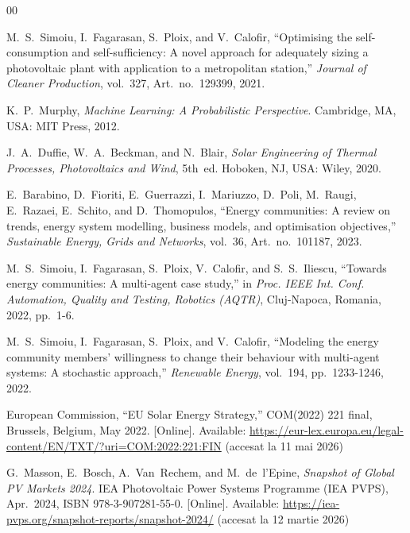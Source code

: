 \documentclass[12pt,a4paper]{report}
\begin{document}
\clearpage

\renewcommand{\bibname}{6. Bibliografie}
\begin{thebibliography}{00}

  M.~S.~Simoiu, I.~Fagarasan, S.~Ploix, and V.~Calofir,
  ``Optimising the self-consumption and self-sufficiency: A novel approach for adequately sizing a photovoltaic plant with application to a metropolitan station,''
  \emph{Journal of Cleaner Production}, vol.~327, Art.~no.~129399, 2021.


  K.~P.~Murphy, \emph{Machine Learning: A Probabilistic Perspective}.
  Cambridge, MA, USA: MIT Press, 2012.

  J.~A.~Duffie, W.~A.~Beckman, and N.~Blair,
  \emph{Solar Engineering of Thermal Processes, Photovoltaics and Wind}, 5th~ed.
  Hoboken, NJ, USA: Wiley, 2020.

  E.~Barabino, D.~Fioriti, E.~Guerrazzi, I.~Mariuzzo, D.~Poli, M.~Raugi, E.~Razaei, E.~Schito, and D.~Thomopulos,
  ``Energy communities: A review on trends, energy system modelling, business models, and optimisation objectives,''
  \emph{Sustainable Energy, Grids and Networks}, vol.~36, Art.~no.~101187, 2023.

  M.~S.~Simoiu, I.~Fagarasan, S.~Ploix, V.~Calofir, and S.~S.~Iliescu,
  ``Towards energy communities: A multi-agent case study,''
  in \emph{Proc. IEEE Int. Conf. Automation, Quality and Testing, Robotics (AQTR)},
  Cluj-Napoca, Romania, 2022, pp.~1-6.

  M.~S.~Simoiu, I.~Fagarasan, S.~Ploix, and V.~Calofir,
  ``Modeling the energy community members' willingness to change their behaviour with multi-agent systems: A stochastic approach,''
  \emph{Renewable Energy}, vol.~194, pp.~1233-1246, 2022.

  European Commission,
  ``EU Solar Energy Strategy,''
  COM(2022) 221 final, Brussels, Belgium, May 2022. [Online]. Available: \url{https://eur-lex.europa.eu/legal-content/EN/TXT/?uri=COM:2022:221:FIN} (accesat la 11 mai 2026)

  G.~Masson, E.~Bosch, A.~Van~Rechem, and M.~de~l'Epine,
  \emph{Snapshot of Global PV Markets 2024}.
  IEA Photovoltaic Power Systems Programme (IEA PVPS), Apr.~2024, ISBN 978-3-907281-55-0. [Online]. Available: \url{https://iea-pvps.org/snapshot-reports/snapshot-2024/} (accesat la 12 martie 2026)


\end{thebibliography}
\end{document}
